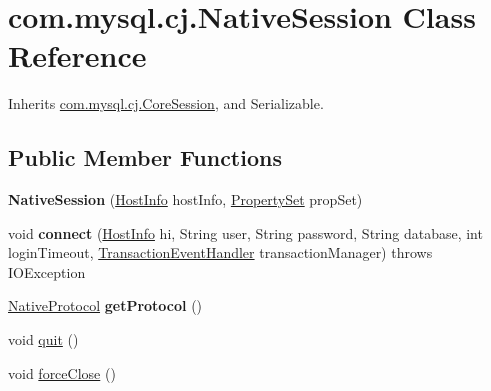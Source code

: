 \hypertarget{classcom_1_1mysql_1_1cj_1_1_native_session}{}\section{com.\+mysql.\+cj.\+Native\+Session Class Reference}
\label{classcom_1_1mysql_1_1cj_1_1_native_session}


Inherits \mbox{\hyperlink{classcom_1_1mysql_1_1cj_1_1_core_session}{com.\+mysql.\+cj.\+Core\+Session}}, and Serializable.

\subsection*{Public Member Functions}
\begin{DoxyCompactItemize}
\item 
\mbox{\label{classcom_1_1mysql_1_1cj_1_1_native_session_a054304603392a1cddd310ad3bbf02084}} 
{\bfseries Native\+Session} (\mbox{\hyperlink{classcom_1_1mysql_1_1cj_1_1conf_1_1_host_info}{Host\+Info}} host\+Info, \mbox{\hyperlink{interfacecom_1_1mysql_1_1cj_1_1conf_1_1_property_set}{Property\+Set}} prop\+Set)
\item 
\mbox{\label{classcom_1_1mysql_1_1cj_1_1_native_session_ae8e367a5aef181ed59a6aa6cb2345946}} 
void {\bfseries connect} (\mbox{\hyperlink{classcom_1_1mysql_1_1cj_1_1conf_1_1_host_info}{Host\+Info}} hi, String user, String password, String database, int login\+Timeout, \mbox{\hyperlink{interfacecom_1_1mysql_1_1cj_1_1_transaction_event_handler}{Transaction\+Event\+Handler}} transaction\+Manager)  throws I\+O\+Exception 
\item 
\mbox{\label{classcom_1_1mysql_1_1cj_1_1_native_session_ae2b07d85734e8e7fd822b1e6f09693a1}} 
\mbox{\hyperlink{classcom_1_1mysql_1_1cj_1_1protocol_1_1a_1_1_native_protocol}{Native\+Protocol}} {\bfseries get\+Protocol} ()
\item 
void \mbox{\hyperlink{classcom_1_1mysql_1_1cj_1_1_native_session_a900fc165192f609b5eddb095ee729ae3}{quit}} ()
\item 
void \mbox{\hyperlink{classcom_1_1mysql_1_1cj_1_1_native_session_abb14a063cc3946e6645393135f776164}{force\+Close}} ()
\item 

\end{DoxyCompactItemize}
